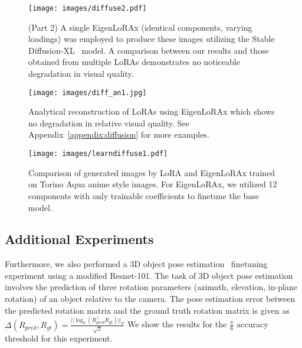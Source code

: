 \begin{figure}[htb]
\begin{center}
\texttt{[image: images/diffuse2.pdf]}
\end{center}
\caption{(Part 2) A single EigenLoRAx (identical components, varying loadings) was employed to produce these images utilizing the Stable Diffusion-XL~\cite{sdxl} model. A comparison between our results and those obtained from multiple LoRAs demonstrates no noticeable degradation in visual quality. }
\label{fig:diffusion2}
\end{figure}
\begin{figure}[htb]
\begin{center}
\texttt{[image: images/diff\_an1.jpg]}
\end{center}
\caption{
\small{Analytical reconstruction of LoRAs using EigenLoRAx which shows no degradation in relative visual quality. 
See Appendix~\ref{appendix:diffusion} for more examples.}}
\label{fig:diffusion}
\end{figure}

\begin{figure}[htb]
\begin{center}
\texttt{[image: images/learndiffuse1.pdf]}
\end{center}
\caption{\small{
Comparison of generated images by LoRA and EigenLoRAx trained on Torino Aqua anime style images. 
For EigenLoRAx, we utilized 12 components with only trainable coefficients to finetune the base model.
}}
\label{fig:traindiffusion}
\end{figure}
\FloatBarrier

\subsection{Additional Experiments}
Furthermore, we also performed a 3D object pose estimation~\citep{wang2020NeMo, Kaushik2024SourceFreeAI} finetuning experiment using a modified Resnet-101. The task of 3D object pose estimation involves the prediction of three rotation parameters (azimuth, elevation, in-plane rotation) of an object relative to the camera. The pose estimation error between the predicted rotation matrix and the ground truth rotation matrix is given as
$\Delta (R_{pred}, R_{gt}) = \frac{\vert\vert \log_b (R_{pred}^{\intercal} R_{gt}) \vert\vert_F}{\sqrt{2}} $
We show the results for the $\frac{\pi}{6}$ accuracy threshold for this experiment.

